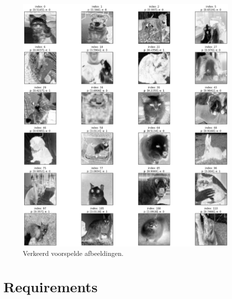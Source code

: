 \begin{figure}
    \centering
    \includegraphics[width=0.7\linewidth]{img/autokeras-5-wrong-images.png}
    \caption{Verkeerd voorspelde afbeeldingen.}
    \label{fig:wrong-prediction-autokeras}
\end{figure}

\section{Requirements}